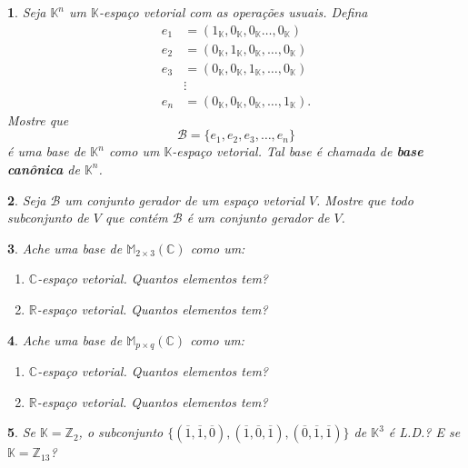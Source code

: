 \documentclass[12pt]{exam}
\newtheorem{exercicio}{}
\newcommand{\integer}{\mathbb{Z}}
\newcommand{\real}{\mathbb{R}}
\newcommand{\complex}{\mathbb{C}}
\newcommand{\cp}[1]{\mathbb{#1}}
\begin{document}
\begin{exercicio}
  Seja $\cp{K}^n$ um $\cp{K}$-espa\c{c}o vetorial com as opera\c{c}\~oes usuais. Defina
  \begin{align*}
    e_1 &= (1_\cp{K}, 0_\cp{K}, 0_\cp{K} \dots, 0_\cp{K})\\
    e_2 &= (0_\cp{K}, 1_\cp{K}, 0_\cp{K}, \dots, 0_\cp{K})\\
    e_3 &= (0_\cp{K}, 0_\cp{K}, 1_\cp{K}, \dots, 0_\cp{K})\\
    &\vdots\\
    e_n &= (0_\cp{K}, 0_\cp{K}, 0_\cp{K}, \dots, 1_\cp{K}).
  \end{align*}
  Mostre que
  \[
    \mathcal{B} = \{e_1, e_2, e_3, \dots, e_n\}
  \]
  \'e uma base de $\cp{K}^n$ como um $\cp{K}$-espa\c{c}o vetorial. Tal base \'e chamada de \textbf{base can\^onica} de $\cp{K}^n$.
\end{exercicio}

\begin{exercicio}
Seja $\mathcal{B}$ um conjunto gerador de um espa\c{c}o vetorial $V$. Mostre que todo subconjunto de $V$ que cont\'em $\mathcal{B}$ \'e um conjunto gerador de $V$.
\end{exercicio}

\begin{exercicio}
  Ache uma base de $\cp{M}_{2 \times 3}(\complex)$ como um:
  \begin{enumerate}[label={\alph*})]
     \item $\complex$-espa\c{c}o vetorial. Quantos elementos tem?
     \item $\real$-espa\c{c}o vetorial. Quantos elementos tem?
   \end{enumerate}
\end{exercicio}

\begin{exercicio}
  Ache uma base de $\cp{M}_{p \times q}(\complex)$ como um:
  \begin{enumerate}[label={\alph*})]
     \item $\complex$-espa\c{c}o vetorial. Quantos elementos tem?
     \item $\real$-espa\c{c}o vetorial. Quantos elementos tem?
   \end{enumerate}
\end{exercicio}

\begin{exercicio}
  Se $\cp{K} = \integer_2$, o subconjunto $\{(\overline{1}, \overline{1}, \overline{0}), (\overline{1}, \overline{0}, \overline{1}), (\overline{0}, \overline{1}, \overline{1})\}$ de $\cp{K}^3$ \'e L.D.? E se $\cp{K} = \integer_{13}$?
\end{exercicio}
\end{document}
